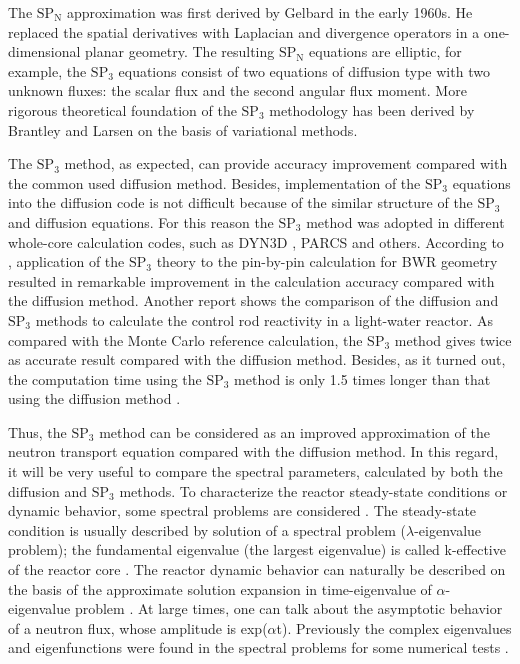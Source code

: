 \documentclass[authoryear]{elsarticle}
\begin{document}
The $\mathrm{SP_N}$ approximation was first derived by Gelbard \citep{gelbard1960application, gelbard1961simplified, gelbard1962applications} in the early 1960s. 
He replaced the spatial derivatives with Laplacian and divergence operators in a one-dimensional planar geometry. 
The resulting $\mathrm{SP_N}$ equations are elliptic, for example, the $\mathrm{SP_3}$ equations consist of two equations of diffusion type with two unknown fluxes: the scalar flux and the second angular flux moment. 
More rigorous theoretical foundation of the $\mathrm{SP_3}$ methodology has been derived by Brantley and Larsen \citep{brantley2000simplified} on the basis of variational methods.

The $\mathrm{SP_3}$ method, as expected, can provide accuracy improvement compared with the common used diffusion method. 
Besides, implementation of the $\mathrm{SP_3}$ equations into the diffusion code is not difficult because of the similar structure of the $\mathrm{SP_3}$ and diffusion equations. 
For this reason the $\mathrm{SP_3}$ method was adopted in different whole-core calculation codes, such as DYN3D \citep{beckert2008development}, PARCS \citep{downar2010theory} and others. According to \citep{tada2008applicability}, application of the $\mathrm{SP_3}$ theory to the pin-by-pin calculation for BWR geometry resulted in remarkable improvement in the calculation accuracy compared with the diffusion method. 
Another report \citep{Brewster2018} shows the comparison of the diffusion and  $\mathrm{SP_3}$ methods to calculate the control rod reactivity  in a light-water reactor. As compared with the Monte Carlo reference calculation, the  $\mathrm{SP_3}$ method gives twice as accurate result compared with the diffusion method. Besides, as it turned out, the computation time using the $\mathrm{SP_3}$ method is only 1.5 times longer than that using the diffusion method \citep{tada2008applicability}.

Thus, the $\mathrm{SP_3}$ method can be considered as an improved approximation of the neutron transport equation compared with the diffusion method. 
In this regard, it will be very useful to compare the spectral parameters, calculated by both the diffusion and $\mathrm{SP_3}$ methods. 
To characterize the reactor steady-state conditions or dynamic behavior, some spectral problems are considered \citep{stacey2007, bell1970}. 
The steady-state condition is usually described by solution of a spectral problem ($\lambda$-eigenvalue problem); the fundamental eigenvalue (the largest eigenvalue) is called k-effective of the reactor core \citep{stacey2007, bell1970}. 
The reactor dynamic behavior can naturally be described on the basis of the approximate solution expansion in time-eigenvalue of $\alpha$-eigenvalue problem \citep{ginestar2002transient, verdu20103d, verdu2014modal}. 
At large times, one can talk about the asymptotic behavior of a neutron flux, whose amplitude is exp($\alpha$t). 
Previously the complex eigenvalues and eigenfunctions were found in the spectral problems for some numerical tests \citep{avvakumov2017spectral}.
\end{document}
